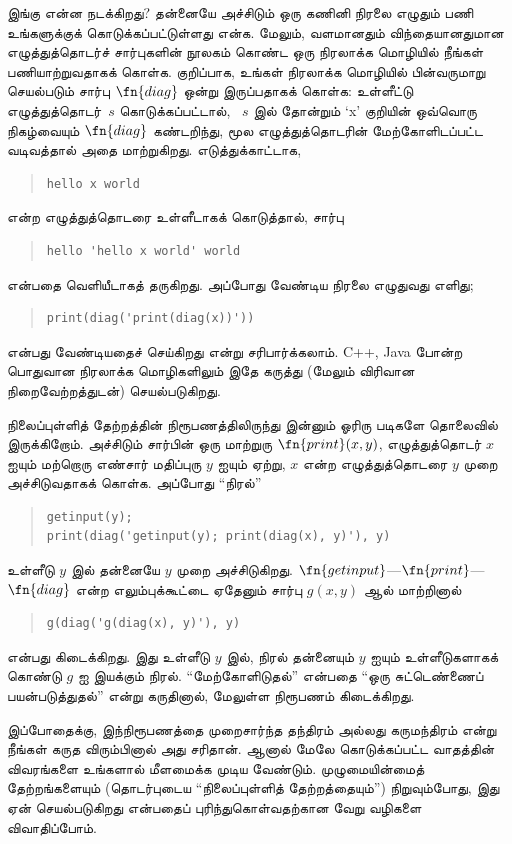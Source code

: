 \documentclass[../../../include/open-logic-section]{subfiles}
\begin{document}
\begin{explain}
இங்கு என்ன நடக்கிறது? தன்னையே அச்சிடும் ஒரு கணினி நிரலை எழுதும்
பணி உங்களுக்குக் கொடுக்கப்பட்டுள்ளது என்க. மேலும், வளமானதும்
விந்தையானதுமான எழுத்துத்தொடர்ச் சார்புகளின் நூலகம் கொண்ட ஒரு
நிரலாக்க மொழியில் நீங்கள் பணியாற்றுவதாகக் கொள்க. குறிப்பாக,
உங்கள் நிரலாக்க மொழியில் பின்வருமாறு செயல்படும் சார்பு
$\fn{diag}$ ஒன்று இருப்பதாகக் கொள்க: உள்ளீட்டு எழுத்துத்தொடர்~$s$
கொடுக்கப்பட்டால், ~$s$ இல் தோன்றும் `x' குறியின் ஒவ்வொரு நிகழ்வையும்
$\fn{diag}$ கண்டறிந்து, மூல எழுத்துத்தொடரின் மேற்கோளிடப்பட்ட
வடிவத்தால் அதை மாற்றுகிறது. எடுத்துக்காட்டாக,
\begin{quote}
\begin{verbatim}
hello x world
\end{verbatim}
\end{quote}
என்ற எழுத்துத்தொடரை உள்ளீடாகக் கொடுத்தால், சார்பு
\begin{quote}
\begin{verbatim}
hello 'hello x world' world
\end{verbatim}
\end{quote}
என்பதை வெளியீடாகத் தருகிறது. அப்போது வேண்டிய நிரலை எழுதுவது எளிது;
\begin{quote}
\begin{verbatim}
print(diag('print(diag(x))'))
\end{verbatim}
\end{quote}
என்பது வேண்டியதைச் செய்கிறது என்று சரிபார்க்கலாம். C++, Java போன்ற
பொதுவான நிரலாக்க மொழிகளிலும் இதே கருத்து (மேலும் விரிவான
நிறைவேற்றத்துடன்) செயல்படுகிறது.

நிலைப்புள்ளித் தேற்றத்தின் நிரூபணத்திலிருந்து இன்னும் ஓரிரு படிகளே
தொலைவில் இருக்கிறோம். அச்சிடும் சார்பின் ஒரு மாற்றுரு
$\fn{print}(x,y)$, எழுத்துத்தொடர் $x$ ஐயும் மற்றொரு எண்சார்
மதிப்புரு $y$ ஐயும் ஏற்று, $x$ என்ற எழுத்துத்தொடரை $y$ முறை
அச்சிடுவதாகக் கொள்க. அப்போது ``நிரல்''
\begin{quote}
\begin{verbatim}
getinput(y);
print(diag('getinput(y); print(diag(x), y)'), y)
\end{verbatim}
\end{quote}
உள்ளீடு $y$ இல் தன்னையே $y$ முறை அச்சிடுகிறது.
$\fn{getinput}$---$\fn{print}$---$\fn{diag}$ என்ற எலும்புக்கூட்டை
ஏதேனும் சார்பு $g(x,y)$ ஆல் மாற்றினால்
\begin{quote}
\begin{verbatim}
g(diag('g(diag(x), y)'), y)
\end{verbatim}
\end{quote}
என்பது கிடைக்கிறது. இது உள்ளீடு $y$ இல், நிரல் தன்னையும் $y$ ஐயும்
உள்ளீடுகளாகக் கொண்டு $g$ ஐ இயக்கும் நிரல். ``மேற்கோளிடுதல்''
என்பதை ``ஒரு சுட்டெண்ணைப் பயன்படுத்துதல்'' என்று கருதினால்,
மேலுள்ள நிரூபணம் கிடைக்கிறது.

இப்போதைக்கு, இந்நிரூபணத்தை முறைசார்ந்த தந்திரம் அல்லது கருமந்திரம்
என்று நீங்கள் கருத விரும்பினால் அது சரிதான். ஆனால் மேலே கொடுக்கப்பட்ட
வாதத்தின் விவரங்களை உங்களால் மீளமைக்க முடிய வேண்டும். முழுமையின்மைத்
தேற்றங்களையும் (தொடர்புடைய ``நிலைப்புள்ளித் தேற்றத்தையும்'')
நிறுவும்போது, இது ஏன் செயல்படுகிறது என்பதைப் புரிந்துகொள்வதற்கான
வேறு வழிகளை விவாதிப்போம்.
\end{explain}
\end{document}
